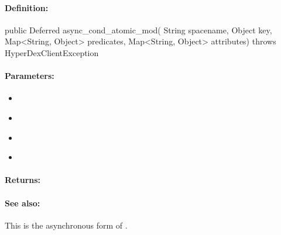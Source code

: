 \paragraph{Definition:}
\begin{javacode}
public Deferred async_cond_atomic_mod(
        String spacename,
        Object key,
        Map<String, Object> predicates,
        Map<String, Object> attributes) throws HyperDexClientException
\end{javacode}

\paragraph{Parameters:}
\begin{itemize}[noitemsep]
\item {}\\

\item {}\\

\item {}\\

\item {}\\

\end{itemize}

\paragraph{Returns:}


\paragraph{See also:}  This is the asynchronous form of .

\pagebreak
\subsubsection{}
\label{api:java:group_atomic_and}


